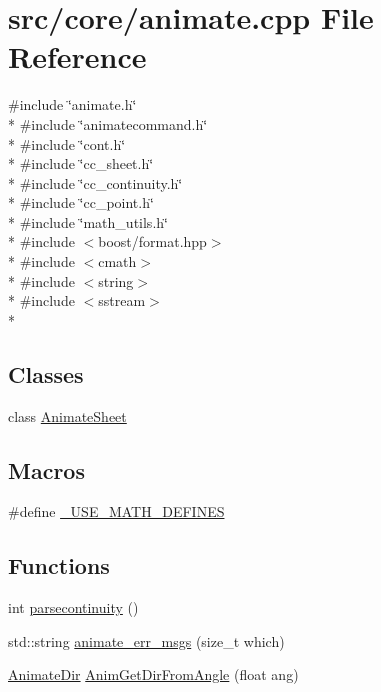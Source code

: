 \hypertarget{a00194}{\section{src/core/animate.cpp File Reference}
\label{a00194}
}
{\ttfamily \#include \char`\"{}animate.\-h\char`\"{}}\\*
{\ttfamily \#include \char`\"{}animatecommand.\-h\char`\"{}}\\*
{\ttfamily \#include \char`\"{}cont.\-h\char`\"{}}\\*
{\ttfamily \#include \char`\"{}cc\-\_\-sheet.\-h\char`\"{}}\\*
{\ttfamily \#include \char`\"{}cc\-\_\-continuity.\-h\char`\"{}}\\*
{\ttfamily \#include \char`\"{}cc\-\_\-point.\-h\char`\"{}}\\*
{\ttfamily \#include \char`\"{}math\-\_\-utils.\-h\char`\"{}}\\*
{\ttfamily \#include $<$boost/format.\-hpp$>$}\\*
{\ttfamily \#include $<$cmath$>$}\\*
{\ttfamily \#include $<$string$>$}\\*
{\ttfamily \#include $<$sstream$>$}\\*
\subsection*{Classes}
\begin{DoxyCompactItemize}
\item 
class \hyperlink{a00008}{Animate\-Sheet}
\end{DoxyCompactItemize}
\subsection*{Macros}
\begin{DoxyCompactItemize}
\item 
\#define \hyperlink{a00194_a525335710b53cb064ca56b936120431e}{\-\_\-\-U\-S\-E\-\_\-\-M\-A\-T\-H\-\_\-\-D\-E\-F\-I\-N\-E\-S}
\end{DoxyCompactItemize}
\subsection*{Functions}
\begin{DoxyCompactItemize}
\item 
int \hyperlink{a00194_ab91f4a3fc9561b6b50d57907e8751643}{parsecontinuity} ()
\item 
std\-::string \hyperlink{a00194_aab4ab291804c5a225333f30233413fc7}{animate\-\_\-err\-\_\-msgs} (size\-\_\-t which)
\item 
\hyperlink{a00196_a6feaf30c8830fe6fcc0982cb7e9621ab}{Animate\-Dir} \hyperlink{a00194_a149d51d42f280c1e82e5934235d35ab7}{Anim\-Get\-Dir\-From\-Angle} (float ang)
\end{DoxyCompactItemize}
